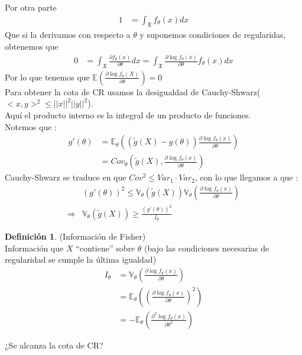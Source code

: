\documentclass[10pt]{article}
\theoremstyle{plain}
\theoremstyle{definition}
\newtheorem{defi}{Definición}
\begin{document}
Por otra parte
\begin{align*}
1 &= \int_{\mathfrak{X}}f_{\theta}(x) dx
\end{align*}
Que si la derivamos con respecto a $\theta$ y suponemos condiciones de regularidas, obtenemos que
\begin{align*}
0 &= \int_{\mathfrak{X}} \frac{\partial f_{\theta}(x)}{\partial \theta} dx = \int_{\mathfrak{X}}\frac{\partial \log f_{\theta}(x)}{\partial \theta} f_{\theta}(x) dx
\end{align*}
Por lo que tenemos que $\mathbb{E}\left(\frac{\partial \log f_{\theta}(X)}{\partial \theta}\right) = 0$\\
Para obtener la cota de CR usamos la desigualdad de Cauchy-Shwarz($<x,y>^2 \le ||x||^2||y||^2$).\\
Aquí el producto interno es la integral de un producto de funciones.\\
Notemos que :
\begin{align*}
g'(\theta) &= \mathbb{E}_{\theta}\left((\tilde{g}(X)-g(\theta)) \frac{\partial \log f_{\theta}(x)}{\partial \theta}\right)\\
&= Cov_{\theta}\left(\tilde{g}(X), \frac{\partial \log f_{\theta}(x)}{\partial \theta}\right)
\end{align*}
Cauchy-Shwarz se traduce en que $Cov^2 \le Var_{1} \cdot Var_{2}$, con lo que llegamos a que :
\begin{align*}
&(g'(\theta))^2 \le \mathbb{V}_{\theta}(\tilde{g}(X)) \mathbb{V}_{\theta}\left(\frac{\partial \log f_{\theta}(x)}{\partial \theta}\right)\\
\Rightarrow & \mathbb{V}_{\theta}(\tilde{g}(X)) \ge \frac{(g'(\theta))^2}{I_{\theta}}
\end{align*}
\begin{defi}(Información de Fisher)\\
Información que $X$ ``contiene'' sobre $\theta$ (bajo las condiciones necesarias de regularidad se cumple la última igualdad)
\begin{align*}
I_{\theta} &= \mathbb{V}_{\theta}\left(\frac{\partial \log f_{\theta}(x)}{\partial \theta}\right) \\
&= \mathbb{E}_{\theta}\left(\left(\frac{\partial \log f_{\theta}(x)}{\partial \theta}\right)^2\right)\\
&= -\mathbb{E}_{\theta}\left(\frac{\partial^2 \log f_{\theta}(x)}{\partial \theta^2}\right)
\end{align*}
\end{defi}
¿Se alcanza la cota de CR?\\
\end{document}
